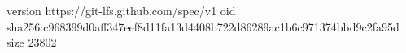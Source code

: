 version https://git-lfs.github.com/spec/v1
oid sha256:c968399d0aff347eef8d11fa13d4408b722d86289ac1b6c971374bbd9c2fa95d
size 23802
